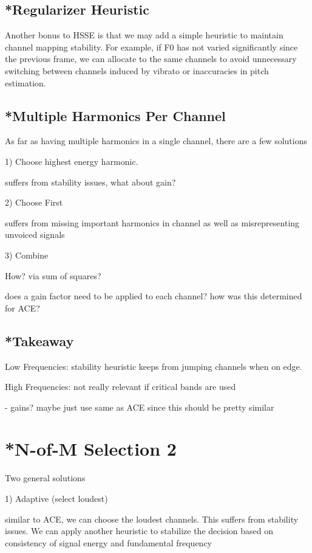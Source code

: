 \documentclass [11pt, proquest] {uwthesis}[2015/03/03]
\begin{document}
\subsection{*Regularizer Heuristic}

Another bonus to HSSE is that we may add a simple heuristic to maintain channel mapping stability.  For example, if F0 has not varied significantly since the previous frame, we can allocate to the same channels to avoid unnecessary switching between channels induced by vibrato or inaccuracies in pitch estimation.

\subsection{*Multiple Harmonics Per Channel}
As far as having multiple harmonics in a single channel, there are a few solutions

1) Choose highest energy harmonic.

suffers from stability issues, what about gain?

2) Choose First

suffers from missing important harmonics in channel as well as misrepresenting unvoiced signals

3) Combine

How?  via sum of squares?

does a gain factor need to be applied to each channel?  how was this determined for ACE?

\subsection{*Takeaway}

Low Frequencies: stability heuristic keeps from jumping channels when on edge.

High Frequencies: not really relevant if critical bands are used

- gains?  maybe just use same as ACE since this should be pretty similar
 

\section{*N-of-M Selection 2}

Two general solutions

1) Adaptive (select loudest)

similar to ACE, we can choose the loudest channels.  This suffers from stability issues.  We can apply another heuristic to stabilize the decision based on consistency of signal energy and fundamental frequency
\end{document}
